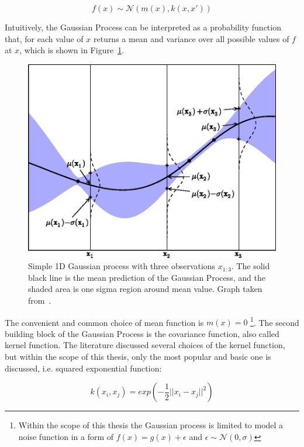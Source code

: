 \begin{equation}
    f(x) \sim  \mathcal{N} \left( m(x), k(x,x')  \right)
\end{equation}

Intuitively, the Gaussian Process can be interpreted as a probability function that, for each value of $x$ returns a mean and variance over all possible values of $f$ at $x$, which is shown in Figure~\ref{fig:GP}.

\begin{figure}
\centering
\includegraphics[scale=0.7]{figures/GaussianProcess.png}
\caption{ Simple 1D Gaussian process with three observations $x_{1:3}$. The solid black line is the mean prediction of the Gaussian Process, and the shaded area is one sigma region around mean value.   
Graph taken from~\cite{BayesianOpt}.
\label{fig:GP}}
\end{figure}

The convenient and common choice of mean function is $m(x) = 0$ \footnote{ Within the scope of this thesis the Gaussian process is limited to model a noise function in a form of $f(x) = g(x) + \epsilon$ and $\epsilon \sim \mathcal{N}(0, \sigma)$ }. 
The second building block of the Gaussian Process is the covariance function, also called kernel function. The literature discussed several choices of the kernel function, but within the scope of this thesis, only the most popular and basic one is discussed, i.e. squared exponential function: 

\begin{equation}
\label{eq:kernel_function}
    k(x_i,x_j) = exp\left( - \frac{1}{2} ||x_i - x_j||^2 \right)
\end{equation}

